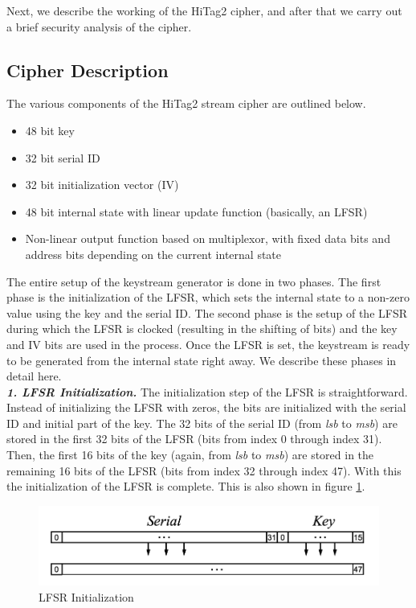 Next, we describe the working of the HiTag2 cipher, and after that we carry out a brief security analysis of the cipher.

\subsection{Cipher Description}
The various components of the HiTag2 stream cipher are outlined below. 
\begin{itemize}
\item 48 bit key
\item 32 bit serial ID
\item 32 bit initialization vector (IV)
\item 48 bit internal state with linear update function (basically, an LFSR)
\item Non-linear output function based on multiplexor, with fixed data bits and address bits depending on the current internal state
\end{itemize}

The entire setup of the keystream generator is done in two phases. The first phase is the initialization of the LFSR, which sets the internal state to a non-zero value using the key and the serial ID. The second phase is the setup of the LFSR during which the LFSR is clocked (resulting in the shifting of bits) and the key and IV bits are used in the process. Once the LFSR is set, the keystream is ready to be generated from the internal state right away. We describe these phases in detail here.\\ 

\textit{\textbf{1. LFSR Initialization.}} The initialization step of the LFSR is straightforward. Instead of initializing the LFSR with zeros, the bits are initialized with the serial ID and initial part of the key. The 32 bits of the serial ID (from \emph{lsb} to \emph{msb}) are stored in the first 32 bits of the LFSR (bits from index 0 through index 31). Then, the first 16 bits of the key (again, from \emph{lsb} to \emph{msb}) are stored in the remaining 16 bits of the LFSR (bits from index 32 through index 47). With this the initialization of the LFSR is complete. This is also shown in figure \ref{fig:hitag2-1}.\\

\begin{figure}[ht!]
	\centering
		\includegraphics[width=5in]{./figures/hitag2-1.PNG}
	\caption{LFSR Initialization}	
	\label{fig:hitag2-1}
\end{figure}

